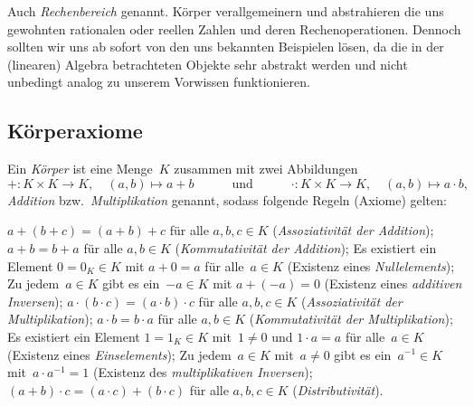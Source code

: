 \documentclass[a4paper]{article}
\begin{document}
Auch \emph{Rechenbereich} genannt. Körper verallgemeinern und abstrahieren die uns gewohnten rationalen oder reellen Zahlen und deren Rechenoperationen. Dennoch sollten wir uns ab sofort von den uns bekannten Beispielen lösen, da die in der (linearen) Algebra betrachteten Objekte sehr abstrakt werden und nicht unbedingt analog zu unserem Vorwissen funktionieren.

\subsection{Körperaxiome}

\begin{definition}[Körper]
    Ein \emph{Körper} ist eine Menge~$K$ zusammen mit zwei Abbildungen
    \begin{equation*}
        +\colon K \times K \to K,\quad (a, b) \mapsto a+b \quad\qquad\text{und}\qquad\quad \cdot\colon K \times K \to K,\quad (a, b) \mapsto a\cdot b,
    \end{equation*}
    \emph{Addition} bzw.\ \emph{Multiplikation} genannt, sodass folgende Regeln (Axiome) gelten:
    \begin{enumerate}[leftmargin=*, widest=(M0)]
         $a+(b+c) = (a+b)+c$ für alle $a, b, c \in K$ (\emph{Assoziativität der Addition});\label{ax:field:aa}
         $a+b = b+a$ für alle $a, b \in K$ (\emph{Kommutativität der Addition});\label{ax:field:ac}
         Es existiert ein Element $0 = 0_K \in K$ mit $a+0 = a$ für alle~$a \in K$ (Existenz eines \emph{Nullelements});\label{ax:field:an}
         Zu jedem~$a \in K$ gibt es ein~$-a \in K$ mit $a+(-a) = 0$ (Existenz eines \emph{additiven Inversen});\label{ax:field:ai}
         $a\cdot(b\cdot c) = (a\cdot b)\cdot c$ für alle $a, b, c \in K$ (\emph{Assoziativität der Multiplikation});\label{ax:field:ma}
         $a\cdot b = b\cdot a$ für alle $a, b \in K$ (\emph{Kommutativität der Multiplikation});\label{ax:field:mc}
         Es existiert ein Element $1 = 1_K \in K$ mit~$1 \neq 0$ und $1\cdot a = a$ für alle~$a \in K$ (Existenz eines \emph{Einselements});\label{ax:field:mn}
         Zu jedem~$a \in K$ mit~$a \neq 0$ gibt es ein~$a^{-1} \in K$ mit~$a\cdot a^{-1} = 1$ (Existenz des \emph{multiplikativen Inversen});\label{ax:field:mi}
         $(a+b)\cdot c = (a\cdot c)+(b\cdot c)$ für alle $a, b, c \in K$ (\emph{Distributivität}).\label{ax:field:d}
    \end{enumerate}
\end{definition}
\end{document}
